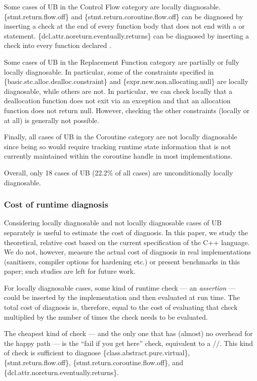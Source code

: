 Some cases of UB in the Control Flow category are locally diagnosable. \{stmt.return.flow.off\} and \{stmt.return.coroutine.flow.off\} can be diagnosed by inserting a check at the end of every function body that does not end with a  or  statement. \{dcl.attr.noreturn.eventually.returns\} can be diagnosed by inserting a check into every function declared \tcode{[[noreturn]]}.

Some cases of UB in the Replacement Function category are partially or fully locally diagnosable. In particular, some of the constraints specified in \{basic.stc.alloc.dealloc.constraint\} and \{expr.new.non.allocating.null\} are locally diagnosable, while others are not. In particular, we can check locally that a deallocation function does not exit via an exception and that an allocation function does not return null. However, checking the other constraints (locally or at all) is generally not possible.

Finally, all cases of UB in the Coroutine category are not locally diagnosable since being so would require tracking runtime state information that is not currently maintained within the coroutine handle in most implementations.

Overall, only 18 cases of UB (22.2\% of all cases) are unconditionally locally diagnosable.

\subsubsection{Cost of runtime diagnosis}
\label{cost}

Considering locally diagnosable and not locally diagnosable cases of UB separately is useful to estimate the cost of diagnosis. In this paper, we study the theoretical, relative cost based on the current specification of the C++ language. We do not, however, measure the actual cost of diagnosis in real implementations (sanitisers, compiler options for hardening etc.) or present benchmarks in this paper; such studies are left for future work.

For locally diagnosable cases, some kind of runtime check --- an \emph{assertion} --- could be inserted by the implementation and then evaluated at run time. The total cost of diagnosis is, therefore, equal to the cost of evaluating that check multiplied by the number of times the check needs to be evaluated.

The cheapest kind of check --- and the only one that has (almost) no overhead for the happy path --- is the ``fail if you get here'' check, equivalent to a //. This kind of check is sufficient to diagnose \{class.abstract.pure.virtual\}, \{stmt.return.flow.off\}, \{stmt.return.coroutine.flow.off\}, and \{dcl.attr.noreturn.eventually.returns\}.

